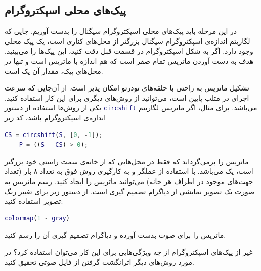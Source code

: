 \documentclass{utsignal}
\begin{document}
	\subsection{پیک‌های محلی اسپکتروگرام} \label{ssec:local-peaks}
	در این مرحله باید پیک‌های محلی اسپکتروگرام سیگنال را بدست آوریم. جایی که لگاریتم اندازه‌ی اسپکتروگرام سیگنال بزرگتر از محل‌های کناری است، یک پیک محلی وجود دارد. اگر به شکل اسپکتروگرام در قسمت قبل دقت کنید، این پیک‌ها را می‌بینید. هدف به دست آوردن ماتریس تمام صفر  است که هم اندازه با ماتریس  است و تنها در محل‌های پیک، مقدار آن یک است.
	
	تشکیل ماتریس  به راحتی با حلقه‌های تودرتو امکان پذیر است. از آن‌جایی که سرعت اجرای  در متلب پایین است، می‌توانید از روش‌های دیگری برای این کار استفاده کنید. یکی از روش‌ها استفاده از دستور \lstinline[language=Matlab]{circshift} می‌باشد. برای مثال، اگر  ماتریس لگاریتم اندازه‌ی اسپکتروگرام باشد، کد زیر
	\begin{latin}
		\begin{lstlisting}[language=Matlab]
	CS = circshift(S, [0, -1]);
	P = ((S - CS) > 0);\end{lstlisting}
	\end{latin}
\noindent ماتریس  را برمی‌گرداند که فقط در محل‌هایی که  از خانه‌ی سمت راستی خود بزرگتر است، یک می‌باشد. با استفاده از عملگر \lr{\&} و به کارگیری روش فوق به تعداد ۸ بار (تعداد جهت‌های موجود در اطراف هر خانه) ‌می‌توانید ماتریس  را ایجاد کنید. رسم ماتریس  به صورت یک تصویر نمایشی از دیاگرام تصمیم گیری است.
از دستور زیر برای تغییر رنگ تصویر استفاده کنید:
	\begin{latin}
		\begin{lstlisting}[language=Matlab]
	colormap(1 - gray)\end{lstlisting}
	\end{latin}
ماتریس  را برای صوت  بدست آورده و دیاگرام تصمیم گیری آن را رسم کنید.

غیر‌ از پیک‌های اسپکتروگرام از چه‌ ویژگی‌هایی برای این کار می‌توان استفاده کرد؟ در مورد روش‌های دیگر اثرانگشت گرفتن از فایل صوتی تحقیق کنید.
\end{document}
